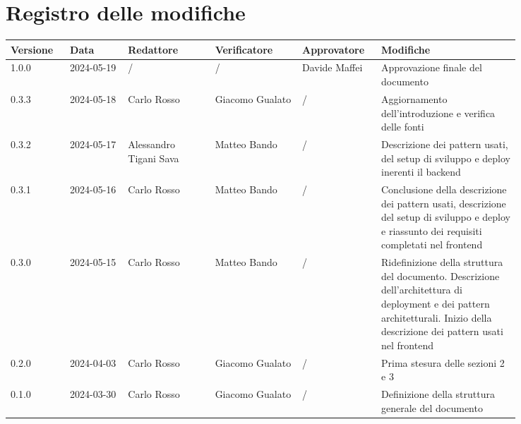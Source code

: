 \section*{Registro delle modifiche}
 {
  \renewcommand{\arraystretch}{1.5}
  \scriptsize
  \begin{longtable}{p{0.10\linewidth}p{0.10\linewidth}p{0.15\linewidth}p{0.15\linewidth}p{0.10\linewidth}p{0.24\linewidth}}
	  \textbf{Versione} & \textbf{Data} & \textbf{Redattore}		& \textbf{Verificatore} & \textbf{Approvatore} & \textbf{Modifiche}	\\
	  \toprule
	  1.0.0             & 2024-05-19    & /							& /                     & Davide Maffei        & Approvazione finale del documento	\\
	  \hline
	  0.3.3             & 2024-05-18    & Carlo Rosso				& Giacomo Gualato       & /                    & Aggiornamento dell'introduzione e verifica delle fonti \\
	  \hline
	  0.3.2             & 2024-05-17    & Alessandro Tigani Sava	& Matteo Bando          & /                    & Descrizione dei pattern usati, del setup di sviluppo e deploy inerenti il backend	\\
	  \hline
	  0.3.1             & 2024-05-16    & Carlo Rosso				& Matteo Bando          & /                    & Conclusione della descrizione dei pattern usati, descrizione del setup di sviluppo e deploy e riassunto dei requisiti completati nel frontend \\
	  \hline
	  0.3.0             & 2024-05-15    & Carlo Rosso				& Matteo Bando			& /						& Ridefinizione della struttura del documento. Descrizione dell'architettura di deployment e dei pattern architetturali. Inizio della descrizione dei pattern usati nel frontend\\
	  \hline
	  0.2.0             & 2024-04-03    & Carlo Rosso				& Giacomo Gualato		& /                    & Prima stesura delle sezioni 2 e 3	\\
	  \hline
	  0.1.0             & 2024-03-30    & Carlo Rosso				& Giacomo Gualato		& /                    & Definizione della struttura generale del documento     \\
	  \bottomrule
  \end{longtable}
 }
